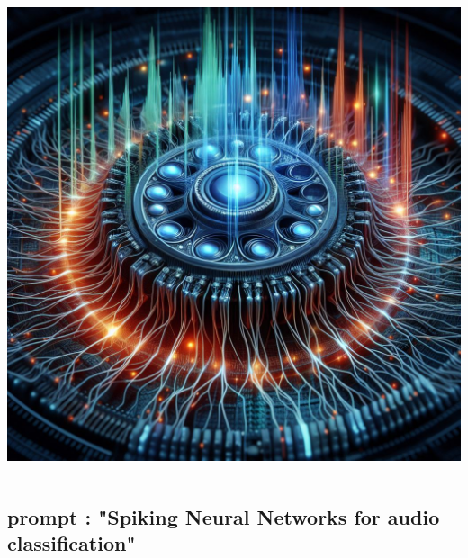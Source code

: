 \documentclass[aspectratio=169, 11pt]{beamer}
\begin{document}
\begin{frame}
\begin{columns}
    \begin{column}{0.5\textwidth} %
      \includegraphics[width=\textwidth]{image/1.jpeg}
    \end{column}
  \end{columns}
\end{frame}

\subsection*{prompt : "Spiking Neural Networks for audio classification"}
\end{document}
